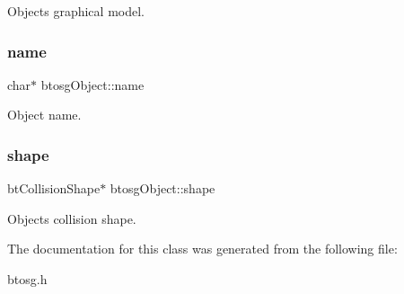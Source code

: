 Object\textquotesingle{}s graphical model. 

\mbox{\label{classbtosgObject_a12396e1362797a75473a2e833b579cc9}} 
\subsubsection{\texorpdfstring{name}{name}}
{\footnotesize\ttfamily char$\ast$ btosg\+Object\+::name\hspace{0.3cm}{\ttfamily [inherited]}}



Object name. 

\mbox{\label{classbtosgObject_a0f6a8da01cf643c321bffe86e42604b0}} 
\subsubsection{\texorpdfstring{shape}{shape}}
{\footnotesize\ttfamily bt\+Collision\+Shape$\ast$ btosg\+Object\+::shape\hspace{0.3cm}{\ttfamily [inherited]}}



Object\textquotesingle{}s collision shape. 



The documentation for this class was generated from the following file\+:\begin{DoxyCompactItemize}
\item 
btosg.\+h\end{DoxyCompactItemize}
